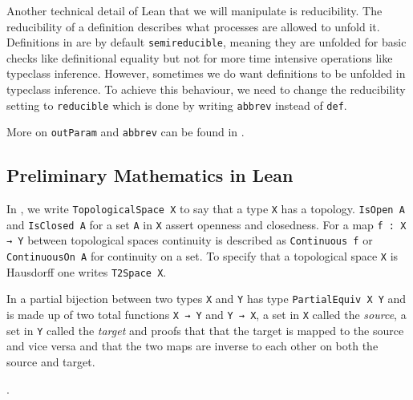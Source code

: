 Another technical detail of Lean that we will manipulate is reducibility.
The reducibility of a definition describes what processes are allowed to unfold it. 
Definitions in \mathlib are by default \lstinline|semireducible|, meaning they are unfolded for basic checks like definitional equality but not for more time intensive operations like typeclass inference.
However, sometimes we do want definitions to be unfolded in typeclass inference. 
To achieve this behaviour, we need to change the reducibility setting to \lstinline|reducible| which is done by writing \lstinline|abbrev| instead of \lstinline|def|. 

More on \lstinline|outParam| and \lstinline|abbrev| can be found in \cite{LeanReference2025}.


\subsection{Preliminary Mathematics in Lean}\label{sub:mathinlean}

In \mathlib, we write \lstinline|TopologicalSpace X| to say that a type \lstinline|X| has a topology. 
\lstinline|IsOpen A| and \lstinline|IsClosed A| for a set \lstinline|A| in \lstinline|X| assert openness and closedness. 
For a map \lstinline|f : X → Y| between topological spaces continuity is described as \lstinline|Continuous f| or \lstinline|ContinuousOn A| for continuity on a set. 
To specify that a topological space \lstinline|X| is Hausdorff one writes \lstinline|T2Space X|.

In \mathlib a partial bijection between two types \lstinline|X| and \lstinline|Y| has type \lstinline|PartialEquiv X Y| and is made up of two total functions \lstinline|X → Y| and \lstinline|Y → X|, a set in \lstinline|X| called the \emph{source}, a set in \lstinline|Y| called the \emph{target} and proofs that that the target is mapped to the source and vice versa and that the two maps are inverse to each other on both the source and target.

.